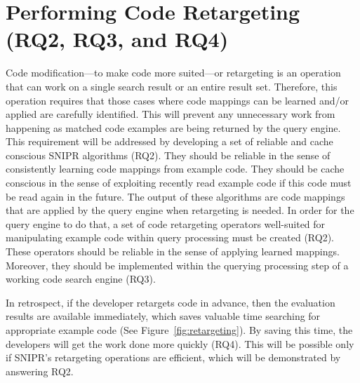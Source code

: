 \section{Performing Code Retargeting (RQ2, RQ3, and RQ4)}
\label{sec:restqs}
Code modification---to make code more suited---or retargeting is an operation that can work on a single search result or an entire result set. Therefore, this operation requires that those cases where code mappings can be learned and/or applied are carefully identified. This will prevent any unnecessary work from happening as matched code examples are being returned by the query engine. This requirement will be addressed by developing a set of reliable and cache conscious \uppercase{SnipR} algorithms (RQ2). They should be reliable in the sense of consistently learning code mappings from example code. They should be cache conscious in the sense of exploiting recently read example code if this code must be read again in the future. The output of these algorithms are code mappings that are applied by the query engine when retargeting is needed. In order for the query engine to do that, a set of code retargeting operators well-suited for manipulating example code within query processing must be created (RQ2). These operators should be reliable in the sense of applying learned mappings. Moreover, they should be implemented within the querying processing step of a working code search engine (RQ3). 

In retrospect, if the developer retargets code in advance, then the evaluation results are available immediately, which saves valuable time searching for appropriate example code (See Figure~\ref{fig:retargeting}). By saving this time, the developers will get the work done more quickly (RQ4). This will be possible only if \uppercase{SnipR}'s retargeting operations are efficient, which will be demonstrated by answering RQ2. 


